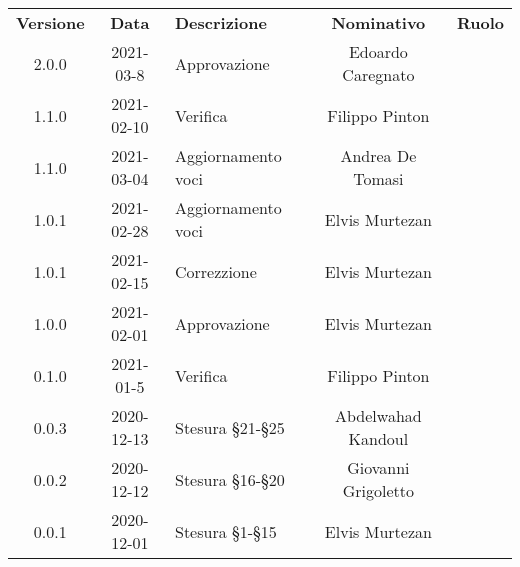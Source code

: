 {
    \renewcommand{\arraystretch}{1.5}
    \centering
    \begin{longtable}{ c c  C{4cm}  c  c }
        \rowcolor{\primaryColor}
        \textcolor{\secondaryColor}{
        \textbf{Versione}}     & \textcolor{\secondaryColor}{\textbf{Data}}       & \textcolor{\secondaryColor}
        {\textbf{Descrizione}} & \textcolor{\secondaryColor}{\textbf{Nominativo}} & \textcolor{\secondaryColor}{\textbf{Ruolo}}                          \\


        2.0.0                  & 2021-03-8                                       & Approvazione     & Edoardo Caregnato & \responsabile{} \\
        1.1.0                  & 2021-02-10                                       & Verifica     & Filippo Pinton & \verificatore{} \\
        1.1.0                  & 2021-03-04                                       & Aggiornamento voci     & Andrea De Tomasi & \redattore{} \\
        1.0.1                  & 2021-02-28                                       & Aggiornamento voci     & Elvis Murtezan & \redattore{} \\
        1.0.1                  & 2021-02-15                                       & Correzzione             & Elvis Murtezan & \redattore{} \\
        1.0.0                  & 2021-02-01                                       & Approvazione              & Elvis Murtezan& \responsabile{} \\

        0.1.0                  & 2021-01-5                                       & Verifica             & Filippo Pinton & \verificatore{} \\

        0.0.3                  & 2020-12-13                                       & Stesura §21-§25              & Abdelwahad Kandoul & \redattore{} \\
        
        0.0.2                  & 2020-12-12                                       & Stesura §16-§20              & Giovanni Grigoletto & \redattore{} \\

        0.0.1                  & 2020-12-01                                       & Stesura §1-§15              & Elvis Murtezan & \redattore{} \\
    \end{longtable}
}